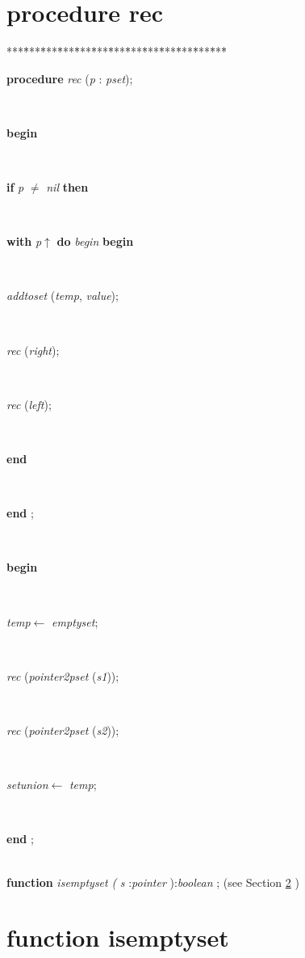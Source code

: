 \documentclass[10pt, a4paper]{article}
\begin{document}
\section{procedure rec}\label{sec:genericset/pointer2pset/setle/setge/setequals/setdifference/rec/setsymetricdifference/setintersection/rec/setunionrec}

\begin{tabbing}
***\=***\=***\=***\=***\=***\=***\=***\=***\=***\=***\=***\=***\=\kill
\parbox{14cm}{\textsf {\textbf {procedure } \textsf{\textit{rec} (\textit{p} : \textit{pset})}; }}\\
\+\parbox{14cm}{\textsf{\textbf{begin} }}\\
\+\parbox{14cm}{\textsf {\textbf {if } \textsf{\textit{p} $\neq$ \textit{nil}} \textbf{ then } }}\\
\+\<\parbox{14cm}{\textsf {\textbf {with } \textsf{\textit{p}$\uparrow$\textit{}} \textbf{ do } \textsf{\textit{begin}} \textbf{ begin } }}\\
\parbox{14cm}{\textsf{\textit{addtoset} (\textit{temp}, \textit{value})}; }\\
\parbox{14cm}{\textsf{\textit{rec} (\textit{right})}; }\\
\parbox{14cm}{\textsf{\textit{rec} (\textit{left})}; }\\
\<\-\parbox{14cm}{\textsf{\textbf{end} }}\\
\<\-\<\-\parbox{14cm}{\textsf{\textbf{end} ;}}\\
\+\parbox{14cm}{\textsf{\textbf{begin} }}\\
\parbox{14cm}{\textsf{\textit{temp}$\leftarrow$ \textit{emptyset}}; }\\
\parbox{14cm}{\textsf{\textit{rec} (\textit{pointer2pset} (\textit{s1}))}; }\\
\parbox{14cm}{\textsf{\textit{rec} (\textit{pointer2pset} (\textit{s2}))}; }\\
\parbox{14cm}{\textsf{\textit{setunion}$\leftarrow$ \textit{temp}}; }\\
\<\-\parbox{14cm}{\textsf{\textbf{end} ;}}\\
\+\textsf{\textbf{function}  \textit{isemptyset} \textit{(} \textit{s} :\textit{pointer} ):\textit{boolean} ;} (see Section \ref{sec:genericset/pointer2pset/setle/setge/setequals/setdifference/rec/setsymetricdifference/setintersection/rec/setunion/recisemptyset} )\\
\end{tabbing}
\section{function isemptyset}\label{sec:genericset/pointer2pset/setle/setge/setequals/setdifference/rec/setsymetricdifference/setintersection/rec/setunion/recisemptyset}
\end{document}
